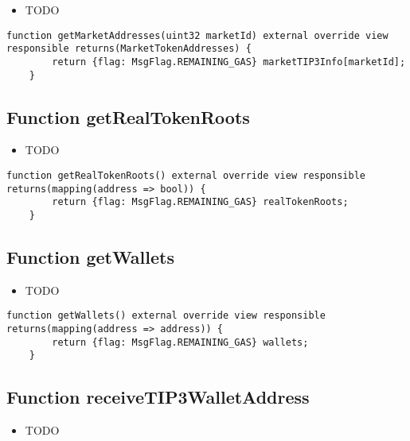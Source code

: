 \noindent\begin{itemize}
\item TODO
\end{itemize}

\begin{lstlisting}[firstnumber=284]
    function getMarketAddresses(uint32 marketId) external override view responsible returns(MarketTokenAddresses) {
        return {flag: MsgFlag.REMAINING_GAS} marketTIP3Info[marketId];
    }
\end{lstlisting}

\subsection{Function getRealTokenRoots}

\noindent\begin{itemize}
\item TODO
\end{itemize}

\begin{lstlisting}[firstnumber=276]
    function getRealTokenRoots() external override view responsible returns(mapping(address => bool)) {
        return {flag: MsgFlag.REMAINING_GAS} realTokenRoots;
    }
\end{lstlisting}

\subsection{Function getWallets}

\noindent\begin{itemize}
\item TODO
\end{itemize}

\begin{lstlisting}[firstnumber=280]
    function getWallets() external override view responsible returns(mapping(address => address)) {
        return {flag: MsgFlag.REMAINING_GAS} wallets;
    }
\end{lstlisting}

\subsection{Function receiveTIP3WalletAddress}

\noindent\begin{itemize}
\item TODO
\end{itemize}

